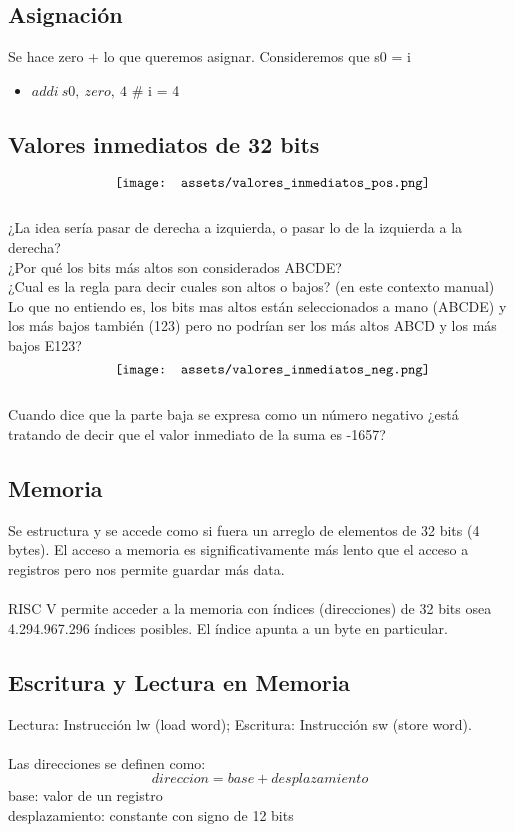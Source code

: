 \documentclass[10pt,a4paper]{article}
\begin{document}
\subsection*{Asignación}
Se hace zero + lo que queremos asignar. Consideremos que s0 = i
\begin{itemize}
    \item \(addi \ s0,\ zero,\ 4\) \# i = 4
\end{itemize}
\subsection*{Valores inmediatos de 32 bits}
\[\begin{minipage}[b]{0.6\textwidth}
    \texttt{[image: assets/valores\_inmediatos\_pos.png]}
    \label{fig:valores_pos}
\end{minipage}\]
¿La idea sería pasar de derecha a izquierda, o pasar lo de la izquierda a la derecha? \\
¿Por qué los bits más altos son considerados ABCDE? \\
¿Cual es la regla para decir cuales son altos o bajos? (en este contexto manual)
Lo que no entiendo es, los bits mas altos están seleccionados a mano (ABCDE) y los más bajos también (123) pero no podrían ser los más altos ABCD y los más bajos E123?
\[\begin{minipage}[b]{0.6\textwidth}
    \texttt{[image: assets/valores\_inmediatos\_neg.png]}
    \label{fig:valores_neg}
\end{minipage}\]
Cuando dice que la parte baja se expresa como un número negativo ¿está tratando de decir que el valor inmediato de la suma es -1657?
\subsection*{Memoria}
Se estructura y se accede como si fuera un arreglo de elementos de 32 bits (4 bytes). El acceso a memoria es significativamente más lento que el acceso a registros pero nos permite guardar más data. \\ \\
RISC V permite acceder a la memoria con índices (direcciones) de 32 bits osea 4.294.967.296 índices posibles. El índice apunta a un byte en particular. \\ \subsection*{Escritura y Lectura en Memoria}
Lectura: Instrucción lw (load word); Escritura: Instrucción sw (store word). \\ \\
Las direcciones se definen como: 
\[direccion = base + desplazamiento\]
base: valor de un registro \\
desplazamiento: constante con signo de 12 bits
\end{document}
